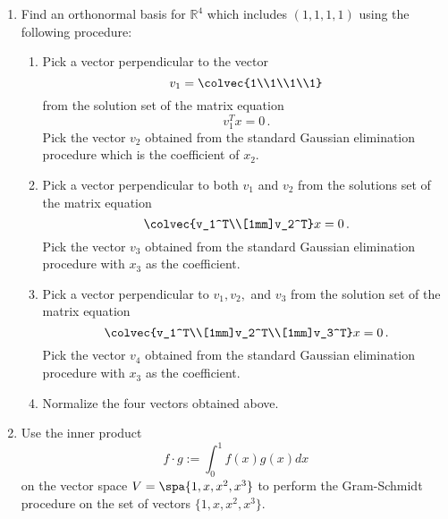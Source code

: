 \begin{enumerate}




\item Find an orthonormal  basis for $\mathbb{R}^4$ which includes $(1,1,1,1)$ using the following procedure:\\
\begin{enumerate} 
\item Pick a vector perpendicular to the vector 
\[v_1 =\colvec{1\\1\\1\\1}\] from the solution set of the matrix equation \[v_1^Tx=0\, .\] Pick the vector $v_2$ obtained from the standard Gaussian elimination procedure which is the coefficient of $x_2$.
\item Pick a vector perpendicular to both $v_1$ and $v_2$ from the solutions set of the matrix equation \[\colvec{v_1^T\\[1mm]v_2^T}x=0\, .\] Pick the vector $v_3$ obtained from the standard Gaussian elimination procedure with $x_3$ as the coefficient. 
\item Pick a vector perpendicular to $v_1,v_2,$ and $v_3$ from the solution set of the matrix equation \[\colvec{v_1^T\\[1mm]v_2^T\\[1mm]v_3^T}x=0\, .\]  Pick the vector $v_4$ obtained from the standard Gaussian elimination procedure with $x_3$ as the coefficient. 
\item Normalize the four vectors obtained   above.
\end{enumerate}


\item Use the inner product \[f\cdot g := \int_0^1 f(x)g(x)dx\]  on the vector space $V=\spa \{1,x,x^2,x^3\}$ to perform the Gram-Schmidt procedure on the set of vectors $\{1,x,x^2,x^3\}$. 


\end{enumerate}
